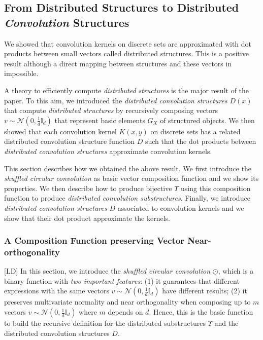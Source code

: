 \documentclass[twoside,11pt]{article}
\def\df{\Upsilon}
\def\mo{\odot}
\newcounter{properties}
\def\mysecondinsert#1{#1}
\def\LD#1{[{\color{blue}L}D] {\color{blue}#1}}
\begin{document}
\subsection{From Distributed Structures to Distributed \emph{Convolution} Structures }
\label{sec:fra}

We showed that convolution kernels on discrete sets are approximated with dot products between small vectors called distributed structures. This is a positive result although a direct mapping between structures and these vectors in impossible. 


A theory to efficiently compute \emph{distributed structures} is the major result of the paper. To this aim, we introduced 
the \emph{distributed convolution structures} $D(x)$ that compute
\emph{distributed structures} by recursively composing vectors $v \sim \mathcal{N}(0,\frac{1}{d}\mathbb{I}_d)$ that represent basic elements $G_X$ of structured objects. We then showed that each convolution kernel $K(x,y)$ on discrete sets has a related distributed convolution structure function $D$ such that  the dot products between \emph{distributed convolution structures}  approximate convolution kernels. 
  

This section describes how we obtained the above result. We first introduce the \emph{shuffled circular convolution} as basic vector composition function and we show its properties. We then describe how to produce bijective $\df$ using this composition function to produce \emph{distributed convolution substructures}. Finally, we introduce \emph{distributed convolution structures} $D$ associated to convolution kernels and we show that their dot product approximate the kernels. 



\subsubsection{\mysecondinsert{A} Composition Function preserving Vector Near-orthogonality}
\label{sec:ideal}

\LD{In this section, we introduce the \emph{shuffled circular convolution} $\mo$, which is a binary function with \emph{two important features}: (1) it guarantees that different expressions with the same vectors $v \sim \mathcal{N}(0,\frac{1}{d}\mathbb{I}_d)$  have different results; (2) it preserves multivariate normality and near orthogonality when composing up to $m$ vectors $v \sim \mathcal{N}(0,\frac{1}{d}\mathbb{I}_d)$ where $m$ depends on $d$.}
{Hence, this is the basic function to build  the recursive definition for the distributed substructures $\df$ and the distributed convolution structures $D$.}
\end{document}
